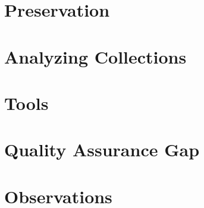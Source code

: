 \section{Preservation}
\section{Analyzing Collections}

\section{Tools}

\section{Quality Assurance Gap}

\section{Observations}
